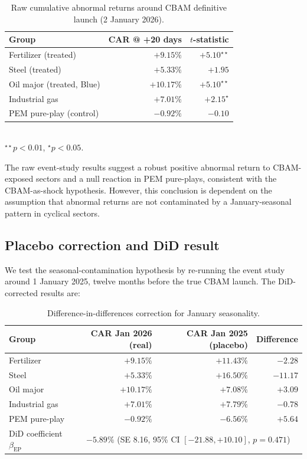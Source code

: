 \documentclass[11pt,a4paper]{article}
\newcommand{\bep}{\beta_{\mathrm{EP}}}
\begin{document}
\begin{table}[ht]
\centering
\caption{Raw cumulative abnormal returns around CBAM definitive launch (2 January 2026).}
\label{tab:ch8-equity-raw}
\begin{tabular}{lrr}
\toprule
Group & CAR @ +20 days & $t$-statistic \\
\midrule
Fertilizer (treated)        & $+9.15\%$  & $+5.10^{\star\star}$ \\
Steel (treated)             & $+5.33\%$  & $+1.95$ \\
Oil major (treated, Blue)   & $+10.17\%$ & $+5.10^{\star\star}$ \\
Industrial gas              & $+7.01\%$  & $+2.15^{\star}$ \\
PEM pure-play (control)     & $-0.92\%$  & $-0.10$ \\
\bottomrule
\end{tabular}
\\\footnotesize{$^{\star\star}p<0.01$, $^{\star}p<0.05$.}
\end{table}

The raw event-study results suggest a robust positive abnormal return to CBAM-exposed sectors and a null reaction in PEM pure-plays, consistent with the CBAM-as-shock hypothesis. However, this conclusion is dependent on the assumption that abnormal returns are not contaminated by a January-seasonal pattern in cyclical sectors.

\subsection{Placebo correction and DiD result}

We test the seasonal-contamination hypothesis by re-running the event study around 1 January 2025, twelve months before the true CBAM launch. The DiD-corrected results are:

\begin{table}[ht]
\centering
\caption{Difference-in-differences correction for January seasonality.}
\label{tab:ch8-equity-did}
\begin{tabular}{lrrr}
\toprule
Group & CAR Jan 2026 (real) & CAR Jan 2025 (placebo) & Difference \\
\midrule
Fertilizer & $+9.15\%$  & $+11.43\%$ & $-2.28$ \\
Steel      & $+5.33\%$  & $+16.50\%$ & $-11.17$ \\
Oil major  & $+10.17\%$ & $+7.08\%$  & $+3.09$ \\
Industrial gas & $+7.01\%$ & $+7.79\%$ & $-0.78$ \\
PEM pure-play & $-0.92\%$ & $-6.56\%$ & $+5.64$ \\
\midrule
DiD coefficient $\bep$ & \multicolumn{3}{c}{$-5.89\%$ (SE 8.16, 95\% CI $[-21.88, +10.10]$, $p = 0.471$)} \\
\bottomrule
\end{tabular}
\end{table}
\end{document}
